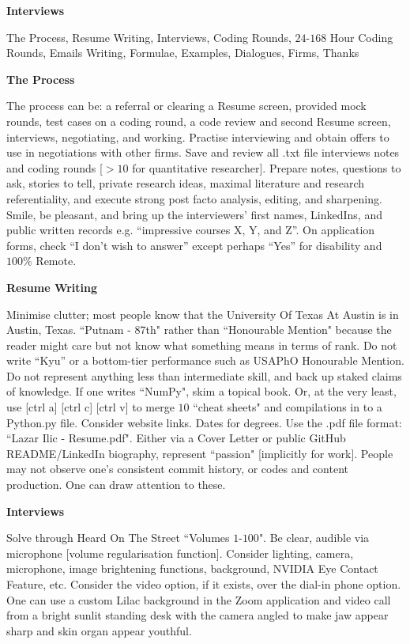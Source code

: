 \huge
\textbf{Interviews}
\Large

The Process, Resume Writing, Interviews, Coding Rounds, $24$-$168$ Hour Coding Rounds, Emails Writing, Formulae, Examples, Dialogues, Firms, Thanks

\textbf{The Process}

The process can be: a referral or clearing a Resume screen, provided mock rounds, test cases on a coding round, a code review and second Resume screen, interviews, negotiating, and working. Practise interviewing and obtain offers to use in negotiations with other firms. Save and review all .txt file interviews notes and coding rounds [$>10$ for quantitative researcher]. Prepare notes, questions to ask, stories to tell, private research ideas, maximal literature and research referentiality, and execute strong post facto analysis, editing, and sharpening. Smile, be pleasant, and bring up the interviewers' first names, LinkedIns, and public written records e.g. ``impressive courses X, Y, and Z''. On application forms, check ``I don't wish to answer'' except perhaps ``Yes'' for disability and $100\%$ Remote.

\textbf{Resume Writing}

Minimise clutter; most people know that the University Of Texas At Austin is in Austin, Texas. ``Putnam - $87$th" rather than ``Honourable Mention" because the reader might care but not know what something means in terms of rank. Do not write ``Kyu'' or a bottom-tier performance such as USAPhO Honourable Mention. Do not represent anything less than intermediate skill, and back up staked claims of knowledge. If one writes ``NumPy", skim a topical book. Or, at the very least, use [ctrl a] [ctrl c] [ctrl v] to merge $10$ ``cheat sheets" and compilations in to a Python.py file. Consider website links. Dates for degrees. Use the .pdf file format: ``Lazar Ilic - Resume.pdf". Either via a Cover Letter or public GitHub README/LinkedIn biography, represent ``passion" [implicitly for work]. People may not observe one's consistent commit history, or codes and content production. One can draw attention to these.

\textbf{Interviews}

Solve through Heard On The Street ``Volumes $1$-$100$". Be clear, audible via microphone [volume regularisation function]. Consider lighting, camera, microphone, image brightening functions, background, NVIDIA Eye Contact Feature, etc. Consider the video option, if it exists, over the dial-in phone option. One can use a custom Lilac background in the Zoom application and video call from a bright sunlit standing desk with the camera angled to make jaw appear sharp and skin organ appear youthful.

